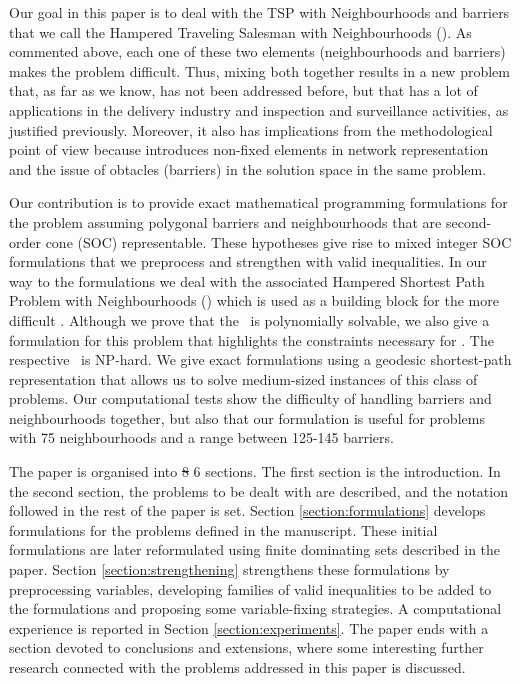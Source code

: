 \documentclass[a4paper,  review, authoryear, 1p.]{elsarticle}
\newcommand{\SPPN}{{\sf{H-SPPN}\xspace }}
\newcommand{\TSPN}{{\sf{H-TSPN}\xspace }}
\newcommand{\CV}[1]{{\color{red}#1}}
\begin{document}
	Our goal in this paper is to deal with the TSP with Neighbourhoods and barriers that we call the Hampered Traveling Salesman with Neighbourhoods (\TSPN ). As commented above, each one of these two elements (neighbourhoods and barriers) makes the problem difficult. Thus, mixing both together results in a new problem that, as far as we know, has not been addressed before, but that has a lot of applications in the delivery industry and inspection and surveillance activities, as justified previously. Moreover, it also has implications from the methodological point of view because introduces non-fixed elements in network representation and the issue of obtacles (barriers) in the solution space in the same problem.
	
	Our contribution is to provide exact mathematical programming formulations for the problem assuming polygonal barriers and neighbourhoods that are second-order cone (SOC) representable. These hypotheses give rise to mixed integer SOC formulations that we preprocess and strengthen with valid inequalities. In our way to the formulations we deal with the associated Hampered Shortest Path Problem with Neighbourhoods (\SPPN ) which is used as a building block for the more difficult \TSPN. Although we prove that the \SPPN \ is polynomially solvable, we also give a formulation for this problem that highlights the constraints necessary for \TSPN. The respective \TSPN \ is NP-hard. We give exact formulations using a geodesic shortest-path representation that allows us to solve medium-sized instances of this class of problems. Our computational tests show the difficulty of handling barriers and neighbourhoods together, but also that our formulation is useful for problems with 75 neighbourhoods and a range between 125-145 barriers.
	
	
	The paper is organised into \sout{8} \CV{6} sections. The first section is the introduction. In the second section, the problems to be dealt with are described, and the notation followed in the rest of the paper is set. Section \ref{section:formulations} develops formulations for the problems defined in the manuscript. These initial formulations are later reformulated using finite dominating sets described in the paper.
	Section \ref{section:strengthening}  strengthens these formulations by preprocessing variables, developing families of valid inequalities to be added to the formulations and proposing some variable-fixing strategies. A computational experience is reported in Section \ref{section:experiments}. The paper ends with a section devoted to conclusions and extensions, where some interesting further research connected with the problems addressed in this paper is discussed.
	
\end{document}
